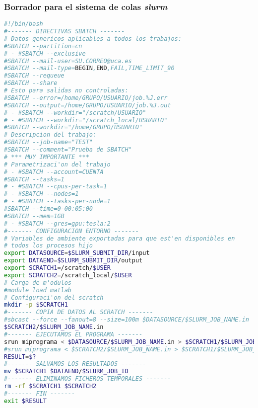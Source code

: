\subsubsection*{Borrador para el sistema de colas \textit{slurm}}
    \begin{lstlisting}[language=sh]
#!/bin/bash
#------- DIRECTIVAS SBATCH -------
# Datos genericos aplicables a todos los trabajos:
#SBATCH --partition=cn
# - #SBATCH --exclusive
#SBATCH --mail-user=SU.CORREO@uca.es
#SBATCH --mail-type=BEGIN,END,FAIL,TIME_LIMIT_90
#SBATCH --requeue
#SBATCH --share
# Esto para salidas no controladas:
#SBATCH --error=/home/GRUPO/USUARIO/job.%J.err
#SBATCH --output=/home/GRUPO/USUARIO/job.%J.out
# - #SBATCH --workdir="/scratch/USUARIO"
# - #SBATCH --workdir="/scratch_local/USUARIO"
#SBATCH --workdir="/home/GRUPO/USUARIO"
# Descripcion del trabajo:
#SBATCH --job-name="TEST"
#SBATCH --comment="Prueba de SBATCH"
# *** MUY IMPORTANTE ***
# Parametrizaci'on del trabajo
# - #SBATCH --account=CUENTA
#SBATCH --tasks=1
# - #SBATCH --cpus-per-task=1
# - #SBATCH --nodes=1
# - #SBATCH --tasks-per-node=1
#SBATCH --time=0-00:05:00
#SBATCH --mem=1GB
# - #SBATCH --gres=gpu:tesla:2
#------- CONFIGURACION ENTORNO -------
# Variables de ambiente exportadas para que est'en disponibles en
# todos los procesos hijo
export DATASOURCE=$SLURM_SUBMIT_DIR/input
export DATAEND=$SLURM_SUBMIT_DIR/output
export SCRATCH1=/scratch/$USER
export SCRATCH2=/scratch_local/$USER
# Carga de m'odulos
#module load matlab
# Configuraci'on del scratch
mkdir -p $SCRATCH1
#------- COPIA DE DATOS AL SCRATCH -------
#sbcast --force --fanout=8 --size=100m $DATASOURCE/$SLURM_JOB_NAME.in
$SCRATCH2/$SLURM_JOB_NAME.in
#------- EJECUTAMOS EL PROGRAMA -------
srun miprograma < $DATASOURCE/$SLURM_JOB_NAME.in > $SCRATCH1/$SLURM_JOB_NAME.out
#srun miprograma < $SCRATCH2/$SLURM_JOB_NAME.in > $SCRATCH1/$SLURM_JOB_NAME.out
RESULT=$?
#------- SALVAMOS LOS RESULTADOS -------
mv $SCRATCH1 $DATAEND/$SLURM_JOB_ID
#------- ELIMINAMOS FICHEROS TEMPORALES -------
rm -rf $SCRATCH1 $SCRATCH2
#------- FIN -------
exit $RESULT
\end{lstlisting}

